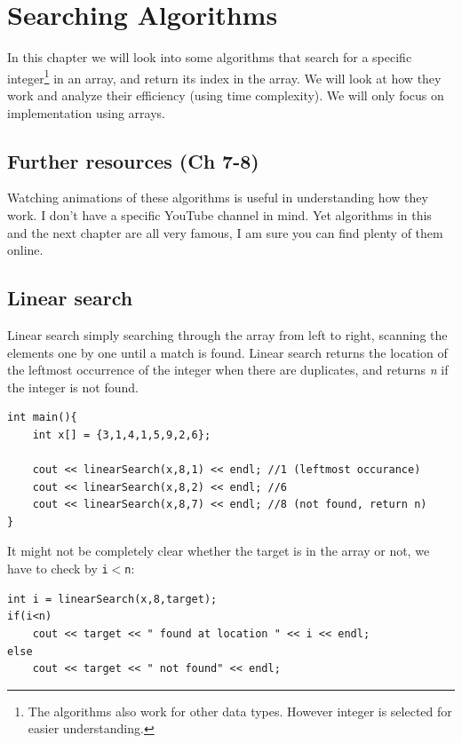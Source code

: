 \chapter{Searching Algorithms}

In this chapter we will look into some algorithms that search for a specific integer\footnote{The algorithms also work for other data types. However integer is selected for easier understanding.} in an array, and return its index in the array. We will look at how they work and analyze their efficiency (using time complexity). We will only focus on implementation using arrays.

\section{Further resources (Ch 7-8)}

Watching animations of these algorithms is useful in understanding how they work. I don't have a specific YouTube channel in mind. Yet algorithms in this and the next chapter are all very famous, I am sure you can find plenty of them online.

\section{Linear search}

Linear search simply searching through the array from left to right, scanning the elements one by one until a match is found. Linear search returns the location of the leftmost occurrence of the integer when there are duplicates, and returns \textit{n} if the integer is not found.

\begin{lstlisting}
int main(){
    int x[] = {3,1,4,1,5,9,2,6};

    cout << linearSearch(x,8,1) << endl; //1 (leftmost occurance)
    cout << linearSearch(x,8,2) << endl; //6
    cout << linearSearch(x,8,7) << endl; //8 (not found, return n)
}
\end{lstlisting}

It might not be completely clear whether the target is in the array or not, we have to check by \texttt{i$<$n}:

\begin{lstlisting}
int i = linearSearch(x,8,target);
if(i<n)
    cout << target << " found at location " << i << endl;
else 
    cout << target << " not found" << endl;
\end{lstlisting}

